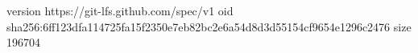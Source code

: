 version https://git-lfs.github.com/spec/v1
oid sha256:6ff123dfa114725fa15f2350e7eb82bc2e6a54d8d3d55154cf9654e1296c2476
size 196704
